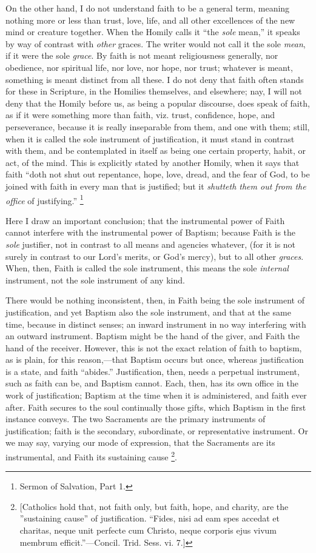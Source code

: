On the other hand, I do not understand faith to be a general term,
meaning nothing more or less than trust, love, life, and all other
excellences of the new mind or creature together. When the Homily
calls it ``the \emph{sole} mean,'' it speaks by way of
contrast with \emph{other} graces. The writer would not call it the
sole \emph{mean}, if it were the sole \emph{grace}. By faith is not
meant religiousness generally, nor obedience, nor spiritual life, nor
love, nor hope, nor trust; whatever is meant, something is meant
distinct from all these. I do not deny that faith often stands for
these in Scripture, in the Homilies themselves, and elsewhere; nay, I
will not deny that the Homily before us, as being a popular discourse,
does speak of faith, as if it were something more than faith, viz.
trust, confidence, hope, and perseverance, because it is really
inseparable from them, and one with them; still, when it is called the
sole instrument of justification, it must stand in contrast with them,
and be contemplated in itself as being one certain property, habit, or
act, of the mind. This is explicitly stated by another Homily, when it
says that faith ``doth not shut out repentance, hope, love, dread,
and the fear of God, to be joined with faith in every man that is
justified; but it \emph{shutteth them out from the office} of
justifying.'' \footnote{Sermon of Salvation, Part 1.}

Here I draw an important conclusion; that the instrumental power of
Faith cannot interfere with the instrumental power of Baptism;
because Faith is the \emph{sole} justifier, not in contrast to all
means and agencies whatever, (for it is not surely in contrast to our
Lord's merits, or God's mercy), but to all other \emph{graces}. When,
then, Faith is called the sole instrument, this means the sole \emph{internal}
instrument, not the sole instrument of any kind.

There would be nothing inconsistent, then, in Faith being the sole
instrument of justification, and yet Baptism also the sole instrument,
and that at the same time, because in distinct senses; an inward
instrument in no way interfering with an outward instrument. Baptism
might be the hand of the giver, and Faith the hand of the receiver.
However, this is not the exact relation of faith to baptism, as is
plain, for this reason,—that Baptism occurs but once, whereas
justification is a state, and faith ``abides.'' Justification,
then, needs a perpetual instrument, such as faith can be, and Baptism
cannot. Each, then, has its own office in the work of justification;
Baptism at the time when it is administered, and faith ever after.
Faith secures to the soul continually those gifts, which Baptism in
the first instance conveys. The two Sacraments are the primary
instruments of justification; faith is the secondary, subordinate, or
representative instrument. Or we may say, varying our mode of
expression, that the Sacraments are its instrumental, and Faith its
sustaining cause \footnote{[Catholics hold
that, not faith only, but faith, hope, and charity, are the
''sustaining cause'' of justification. ``Fides, nisi ad eam
spes accedat et charitas, neque unit perfecte cum Christo, neque
corporis ejus vivum membrum efficit.''—Concil. Trid. Sess. vi.
7.]}.

